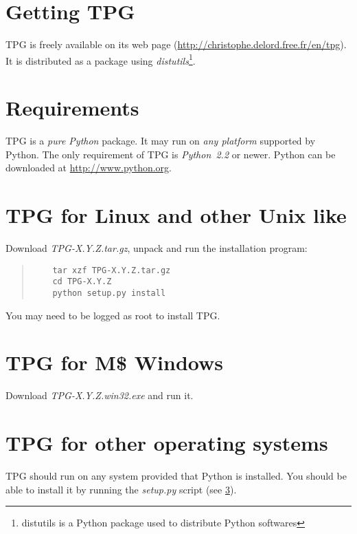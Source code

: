 
\section{Getting TPG}

TPG is freely available on its web page (\url{http://christophe.delord.free.fr/en/tpg}). It is distributed as a package using \emph{distutils}\footnote{distutils is a Python package used to distribute Python softwares}.

\section{Requirements}

TPG is a \emph{pure Python} package.
It may run on \emph{any platform} supported by Python.
The only requirement of TPG is \emph{Python~2.2} or newer. Python can be downloaded at \url{http://www.python.org}.

\section{TPG for Linux and other Unix like}
\label{linux_install}

Download \mbox{\emph{TPG-X.Y.Z.tar.gz}}, unpack and run the installation program:
\begin{quote}
\begin{verbatim}
	tar xzf TPG-X.Y.Z.tar.gz
	cd TPG-X.Y.Z
	python setup.py install
\end{verbatim}
\end{quote}
You may need to be logged as root to install TPG.

\section{TPG for M\$ Windows}

Download \mbox{\emph{TPG-X.Y.Z.win32.exe}} and run it.

\section{TPG for other operating systems}

TPG should run on any system provided that Python is installed. You should be able to install it by running the \mbox{\emph{setup.py}} script (see \ref{linux_install}).
